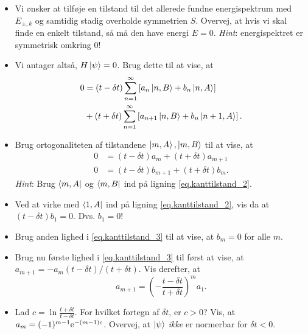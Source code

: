 \documentclass[11pt, a4paper]{article}
\def\te{{\rm e}}
\begin{document}
\begin{itemize}
	\item Vi ønsker at tilføje en tilstand til det allerede fundne energispektrum med $E_{\pm, k}$ og samtidig stadig overholde symmetrien $S$. Overvej, at hvis vi skal finde en enkelt tilstand, så må den have energi $E = 0$. \textit{Hint}: energispektret er symmetrisk omkring 0!

	\item Vi antager altså, $H \ket{\psi} = 0$. Brug dette til at vise, at
	\begin{align}
	0 &= (t - \delta t)\sum_{n = 1}^\infty\left[a_n\ket{n, B} + b_n\ket{n, A}\right] \nonumber \\
	&+ (t + \delta t)\sum_{n = 1}^\infty\left[a_{n + 1}\ket{n, B} + b_n\ket{n + 1, A}\right].
	\label{eq.kanttilstand_2}
	\end{align}

	\item Brug ortogonaliteten af tilstandene $\ket{m, A}, \ket{m, B}$ til at vise, at
	\begin{align}
	0 &= (t - \delta t)a_m + (t + \delta t)a_{m + 1} \nonumber \\
	0 &= (t - \delta t)b_{m + 1} + (t + \delta t)b_m.
	\label{eq.kanttilstand_3}
	\end{align}
	\textit{Hint}: Brug $\bra{m, A}$ og $\bra{m, B}$ ind på ligning \eqref{eq.kanttilstand_2}. 

	\item Ved at virke med $\bra{1, A}$ ind på ligning \eqref{eq.kanttilstand_2}, vis da at $(t - \delta t)b_1 = 0$. Dvs. $b_1 = 0$!

	\item Brug anden lighed i \eqref{eq.kanttilstand_3} til at vise, at $b_m = 0$ for alle $m$. 

	\item Brug nu første lighed i \eqref{eq.kanttilstand_3} til først at vise, at $a_{m + 1} = - a_m (t - \delta t)/(t + \delta t)$. Vis derefter, at
	\begin{equation}
	a_{m + 1} = \left(-\frac{t - \delta t}{t + \delta t}\right)^{m} a_1.
	\label{eq.kanttilstand_4}
	\end{equation}

	\item Lad $c = \ln \frac{t + \delta t}{t - \delta t}$. For hvilket fortegn af $\delta t$, er $c > 0$? Vis, at $a_m = (-1)^{m-1} \te^{-(m - 1)c}$. Overvej, at $\ket{\psi}$ \textit{ikke} er normerbar for $\delta t < 0$. 
\end{itemize}
\end{document}
